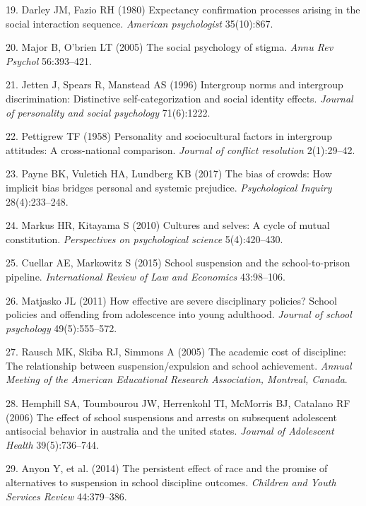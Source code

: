 \documentclass[9pt,twocolumn,twoside,lineno]{pnas-new}
\begin{document}
\hypertarget{ref-darley1980expectancy}{}
19. Darley JM, Fazio RH (1980) Expectancy confirmation processes arising
in the social interaction sequence. \emph{American psychologist}
35(10):867.

\hypertarget{ref-major2005social}{}
20. Major B, O'brien LT (2005) The social psychology of stigma.
\emph{Annu Rev Psychol} 56:393--421.

\hypertarget{ref-jetten1996intergroup}{}
21. Jetten J, Spears R, Manstead AS (1996) Intergroup norms and
intergroup discrimination: Distinctive self-categorization and social
identity effects. \emph{Journal of personality and social psychology}
71(6):1222.

\hypertarget{ref-pettigrew1958personality}{}
22. Pettigrew TF (1958) Personality and sociocultural factors in
intergroup attitudes: A cross-national comparison. \emph{Journal of
conflict resolution} 2(1):29--42.

\hypertarget{ref-payne2017bias}{}
23. Payne BK, Vuletich HA, Lundberg KB (2017) The bias of crowds: How
implicit bias bridges personal and systemic prejudice.
\emph{Psychological Inquiry} 28(4):233--248.

\hypertarget{ref-markus2010cultures}{}
24. Markus HR, Kitayama S (2010) Cultures and selves: A cycle of mutual
constitution. \emph{Perspectives on psychological science}
5(4):420--430.

\hypertarget{ref-cuellar2015school}{}
25. Cuellar AE, Markowitz S (2015) School suspension and the
school-to-prison pipeline. \emph{International Review of Law and
Economics} 43:98--106.

\hypertarget{ref-matjasko2011effective}{}
26. Matjasko JL (2011) How effective are severe disciplinary policies?
School policies and offending from adolescence into young adulthood.
\emph{Journal of school psychology} 49(5):555--572.

\hypertarget{ref-rausch2005academic}{}
27. Rausch MK, Skiba RJ, Simmons A (2005) The academic cost of
discipline: The relationship between suspension/expulsion and school
achievement. \emph{Annual Meeting of the American Educational Research
Association, Montreal, Canada}.

\hypertarget{ref-hemphill2006effect}{}
28. Hemphill SA, Toumbourou JW, Herrenkohl TI, McMorris BJ, Catalano RF
(2006) The effect of school suspensions and arrests on subsequent
adolescent antisocial behavior in australia and the united states.
\emph{Journal of Adolescent Health} 39(5):736--744.

\hypertarget{ref-anyon2014persistent}{}
29. Anyon Y, et al. (2014) The persistent effect of race and the promise
of alternatives to suspension in school discipline outcomes.
\emph{Children and Youth Services Review} 44:379--386.
\end{document}
